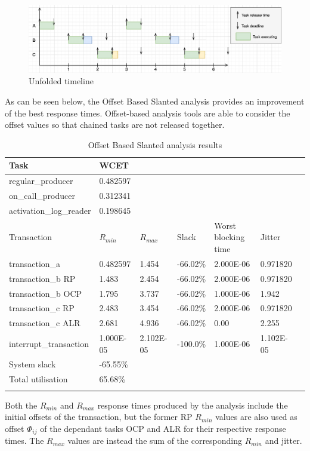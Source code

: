 \documentclass{article}
\begin{document}
\begin{figure}[!htbp]
\centering
\includegraphics[width=6.5in]{images/timeline-offsets}
\caption{Unfolded timeline}
\label{timeline-offsets}
\end{figure}

As can be seen below, the Offset Based Slanted analysis provides an improvement of the best response times. Offset-based analysis tools are able to consider the offset values so that chained tasks are not released together.

\begin{longtable}{lllllll}
   \toprule
   Task & WCET \\
   \midrule
   regular\_producer & 0.482597 \\
   on\_call\_producer & 0.312341 \\
   activation\_log\_reader & 0.198645 \\
   \toprule
   \toprule
   Transaction & $R_{min}$ & $R_{max}$ & Slack & Worst blocking time & Jitter \\
   \midrule
   transaction\_a & 0.482597 & 1.454 & -66.02\% &  2.000E-06 & 0.971820 \\
   transaction\_b RP & 1.483 & 2.454 & -66.02\% & 2.000E-06 & 0.971820 \\
   transaction\_b OCP & 1.795 & 3.737 & -66.02\% & 1.000E-06 & 1.942 \\
   transaction\_c RP & 2.483 & 3.454 & -66.02\% & 2.000E-06 & 0.971820 \\
   transaction\_c ALR & 2.681 & 4.936 & -66.02\% & 0.00 & 2.255 \\
   interrupt\_transaction & 1.000E-05 & 2.102E-05 & -100.0\% & 1.000E-06 & 1.102E-05 \\
   \toprule
   \toprule
   System slack & -65.55\% \\
   Total utilisation & 65.68\% \\
   \bottomrule
   \caption{Offset Based Slanted analysis results}
\label{tab:rm-fps-24-ocp-44-alr-56}
\end{longtable}

Both the $R_{min}$ and $R_{max}$ response times produced by the analysis include the initial offsets of the transaction, but the former RP $R_{min}$ values are also used as offset $\Phi_{ij}$ of the dependant tasks OCP and ALR for their respective response times. The $R_{max}$ values are instead the sum of the corresponding $R_{min}$ and jitter.
\end{document}
